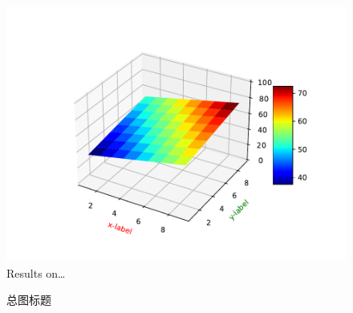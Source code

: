 \documentclass[fontset=windows]{whutmod}
\begin{document}
\begin{figure} 
	\centering 
	\includegraphics[width=.5\textwidth]{test_Figure.pdf}
	\caption{Results on…}
\end{figure}

\begin{figure}
	\centering    
	\caption{总图标题}		%
\end{figure}
\end{document}
